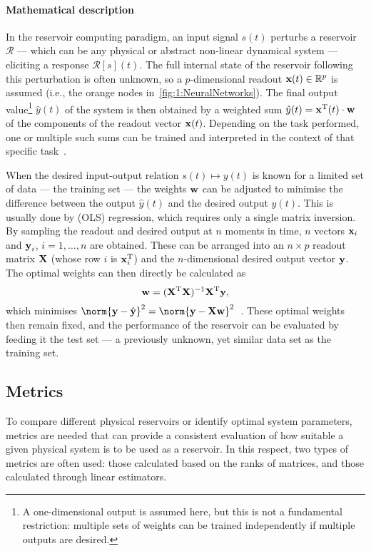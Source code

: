\paragraph{Mathematical description}
In the reservoir computing paradigm, an input signal $s(t)$ perturbs a reservoir $\mathcal{R}$ --- which can be any physical or abstract non-linear dynamical system --- eliciting a response $\mathcal{R}[s](t)$.
The full internal state of the reservoir following this perturbation is often unknown, so a $p$-dimensional readout $\boldsymbol{\mathbf{x}}(t) \in \mathbb{R}^p$ is assumed (i.e., the orange nodes in~\cref{fig:1:NeuralNetworks}).
The final output value\footnote{
	A one-dimensional output is assumed here, but this is not a fundamental restriction: multiple sets of weights can be trained independently if multiple outputs are desired.
} $\hat{y}(t)$ of the system is then obtained by a weighted sum $\hat{y}(t) = \boldsymbol{\mathbf{x}}^\mathrm{T}(t) \cdot \boldsymbol{\mathbf{w}}$ of the components of the readout vector $\boldsymbol{\mathbf{x}}(t)$.
Depending on the task performed, one or multiple such sums can be trained and interpreted in the context of that specific task~\cite{RC_RecentAdvances}. \par %
When the desired input-output relation $s(t) \mapsto y(t)$ is known for a limited set of data --- the training set --- the weights $\boldsymbol{\mathbf{w}}$ can be adjusted to minimise the difference between the output $\hat{y}(t)$ and the desired output $y(t)$.
This is usually done by  (OLS) regression, which requires only a single matrix inversion.
By sampling the readout and desired output at $n$ moments in time, $n$ vectors $\boldsymbol{\mathbf{x}}_i$ and $\boldsymbol{\mathbf{y}}_i$, $i = 1, \dots, n$ are obtained.
These can be arranged into an $n \times p$ readout matrix $\boldsymbol{\mathbf{X}}$ (whose row $i$ is $\boldsymbol{\mathbf{x}}_i^\mathrm{T}$) and the $n$-dimensional desired output vector $\boldsymbol{\mathbf{y}}$.
The optimal weights can then directly be calculated as
\begin{equation}
	\boldsymbol{\mathbf{w}} = (\boldsymbol{\mathbf{X}}^\mathrm{T} \boldsymbol{\mathbf{X}})^{-1} \boldsymbol{\mathbf{X}}^\mathrm{T} \boldsymbol{\mathbf{y}} \mathrm{,}
\end{equation}
which minimises $\norm{\vc{y} - \hat{\vc{y}}}^2 = \norm{\vc{y} - \vc{X}\vc{w}}^2$~\cite{RC_NNN}.
These optimal weights then remain fixed, and the performance of the reservoir can be evaluated by feeding it the test set --- a previously unknown, yet similar data set as the training set.

\subsection{Metrics}\label{sec:1:RC_metrics}
To compare different physical reservoirs or identify optimal system parameters, metrics are needed that can provide a consistent evaluation of how suitable a given physical system is to be used as a reservoir.
In this respect, two types of metrics are often used: those calculated based on the ranks of matrices, and those calculated through linear estimators.


